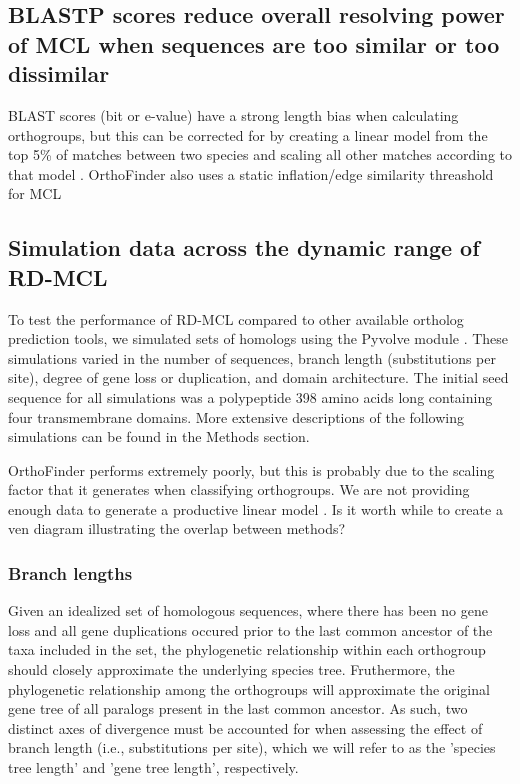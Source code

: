 \documentclass[twocolumn]{bmcart}%
\begin{document}
\lipsum[3]

\subsection{BLASTP scores reduce overall resolving power of MCL when sequences are too similar or too dissimilar}
BLAST scores (bit or e-value) have a strong length bias when calculating orthogroups, but this can be corrected for by creating a linear model from the top 5\% of matches between two species and scaling all other matches according to that model \cite{Emms:2015ig}. OrthoFinder also uses a static inflation/edge similarity threashold for MCL \cite{Emms:2015ig}


\subsection{Simulation data across the dynamic range of RD-MCL}
To test the performance of RD-MCL compared to other available ortholog prediction tools, we simulated sets of homologs using the Pyvolve module \cite{Spielman:2015kv}. These simulations varied in the number of sequences, branch length (substitutions per site), degree of gene loss or duplication, and domain architecture. The initial seed sequence for all simulations was a polypeptide 398 amino acids long containing four transmembrane domains. More extensive descriptions of the following simulations can be found in the Methods section.

OrthoFinder performs extremely poorly, but this is probably due to the scaling factor that it generates when classifying orthogroups. We are not providing enough data to generate a productive linear model \cite{Emms:2015ig}.
Is it worth while to create a ven diagram illustrating the overlap between methods?

\subsubsection{Branch lengths}
Given an idealized set of homologous sequences, where there has been no gene loss and all gene duplications occured prior to the last common ancestor of the taxa included in the set, the phylogenetic relationship within each orthogroup should closely approximate the underlying species tree. Fruthermore, the phylogenetic relationship among the orthogroups will approximate the original gene tree of all paralogs present in the last common ancestor. As such, two distinct axes of divergence must be accounted for when assessing the effect of branch length (i.e., substitutions per site), which we will refer to as the 'species tree length' and 'gene tree length', respectively.
\end{document}
